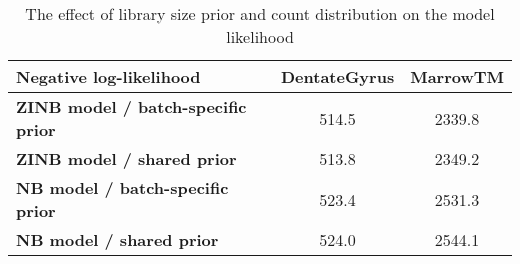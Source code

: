 \begin{table}
\centering
\begin{small}
\begin{tabular}{lcc}
    \toprule
\textbf{Negative log-likelihood}           & \textbf{DentateGyrus} & \textbf{MarrowTM} \\
\midrule
\textbf{ZINB model / batch-specific prior}                        & 514.5        & 2339.8   \\
\textbf{ZINB model / shared prior}  & 513.8        & 2349.2   \\
\textbf{NB model / batch-specific prior}                         & 523.4        & 2531.3   \\
\textbf{NB model / shared prior}   & 524.0        & 2544.1  \\
\bottomrule
\end{tabular}
\end{small}
\caption{ The effect of library size prior and count distribution on the model likelihood
}

\label{library_size_ll}
\centering
\end{table}